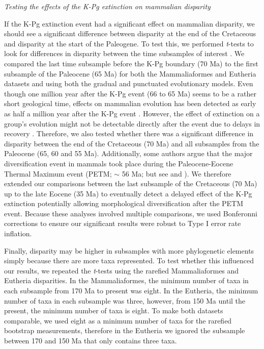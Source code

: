 \documentclass[12pt,letterpaper]{article}
\renewcommand{\subsection}[1]{%
\bigskip
\begin{center}
\begin{large}
\normalfont\itshape #1
\end{large}
\end{center}}
\begin{document}
\subsection{Testing the effects of the K-Pg extinction on mammalian disparity}
If the K-Pg extinction event had a significant effect on mammalian disparity, we should see a significant difference between disparity at the end of the Cretaceous and disparity at the start of the Paleogene.
To test this, we performed \textit{t}-tests to look for differences in disparity between the time subsamples of interest \citep[e.g. as used in][]{anderson2012using,zelditch2012geometric,smith2014joined}.
We compared the last time subsample before the K-Pg boundary (70 Ma) to the first subsample of the Paleocene (65 Ma) for both the Mammaliaformes and Eutheria datasets and using both the gradual and punctuated evolutionary models.
Even though one million year after the K-Pg event (66 to 65 Ma) seems to be a rather short geological time, effects on mammalian evolution has been detected as early as half a million year after the K-Pg event \citep{Wilson2013}.
However, the effect of extinction on a group's evolution might not be detectable directly after the event due to delays in recovery \citep[e.g.][estimated that ecosystems only fully recovered 8-9 Ma after the Permo-Triassic mass extinction]{chen2012timing}.
Therefore, we also tested whether there was a significant difference in disparity between the end of the Cretaceous (70 Ma) and all subsamples from the Paleocene (65, 60 and 55 Ma).
Additionally, some authors argue that the major diversification event in mammals took place during the Paleocene-Eocene Thermal Maximum event (PETM; $\sim$ 56 Ma; \citealt{bininda2007delayed} but see \citealt{meredithimpacts2011} and \citealt{Stadler12042011}).
We therefore extended our comparisons between the last subsample of the Cretaceous (70 Ma) up to the late Eocene (35 Ma) to eventually detect a delayed effect of the K-Pg extinction potentially allowing morphological diversification after the PETM event. 
Because these analyses involved multiple comparisons, we used Bonferonni corrections \citep{holm1979simple} to ensure our significant results were robust to Type I error rate inflation. 

Finally, disparity may be higher in subsamples with more phylogenetic elements simply because there are more taxa represented.
To test whether this influenced our results, we repeated the \textit{t}-tests using the rarefied Mammaliaformes and Eutheria disparities.
In the Mammaliaformes, the minimum number of taxa in each subsample from 170 Ma to present was eight.
In the Eutheria, the minimum number of taxa in each subsample was three, however, from 150 Ma until the present, the minimum number of taxa is eight.
To make both datasets comparable, we used eight as a minimum number of taxa for the rarefied bootstrap measurements, therefore in the Eutheria we ignored the subsample between 170 and 150 Ma that only contains three taxa.
\end{document}
